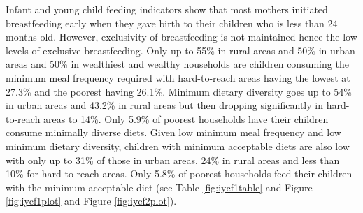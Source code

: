 \documentclass[12pt,a4paper]{article}
\begin{document}
Infant and young child feeding indicators show that most mothers initiated breastfeeding early when they gave birth to their children who is less than 24 months old. However, exclusivity of breastfeeding is not maintained hence the low levels of exclusive breastfeeding. Only up to 55\% in rural areas and 50\% in urban areas and 50\% in wealthiest and wealthy households are children consuming the minimum meal frequency required with hard-to-reach areas having the lowest at 27.3\% and the poorest having 26.1\%. Minimum dietary diversity goes up to 54\% in urban areas and 43.2\% in rural areas but then dropping significantly in hard-to-reach areas to 14\%. Only 5.9\% of poorest households have their children consume minimally diverse diets. Given low minimum meal frequency and low minimum dietary diversity, children with minimum acceptable diets are also low with only up to 31\% of those in urban areas, 24\% in rural areas and less than 10\% for hard-to-reach areas. Only 5.8\% of poorest households feed their children with the minimum acceptable diet (see Table \ref{fig:iycf1table} and Figure \ref{fig:iycf1plot} and Figure \ref{fig:iycf2plot}).
\end{document}
